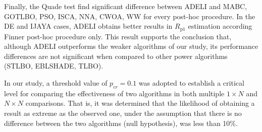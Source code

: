 \documentclass[a4paper,fleqn]{cas-dc}
\begin{document}
Finally, the Quade test find significant difference between ADELI and
MABC, GOTLBO, PSO, ISCA, NNA, CWOA, WW for every post-hoc procedure.
In the DE and IJAYA cases, ADELI obtains better results in $R_\mathrm{p1}$ estimation
according Finner post-hoc procedure only.
This result supports the conclusion that,
although ADELI outperforms the weaker algorithms of our study,
its performance differences are not significant when compared to other power algorithms (STLBO, EBLSHADE, TLBO).

In our study, a threshold value of $p_{cr}=0.1$ was adopted to establish a critical level
for comparing the effectiveness of two algorithms in both multiple $1\times N$ and $N\times N$ comparisons.
That is, it was determined that the likelihood of obtaining a result as extreme as the observed one,
under the assumption that there is no difference between the two algorithms (null hypothesis), was less than 10\%.
\end{document}
